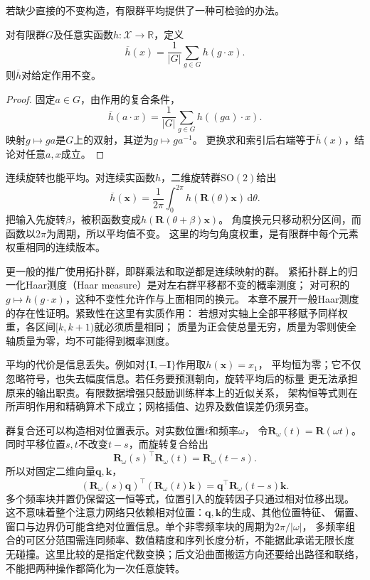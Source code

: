 若缺少直接的不变构造，有限群平均提供了一种可检验的办法。
\begin{theorem}[有限群平均的不变性]
\label{thm:geometry-finite-group-average}
对有限群$G$及任意实函数$h:\mathcal X\to\mathbb R$，定义
\begin{equation}
 \overline h(x)=\frac1{|G|}\sum_{g\in G}h(g\cdot x).
 \label{eq:geometry-finite-group-averaging}
\end{equation}
则$\overline h$对给定作用不变。
\end{theorem}
\begin{proof}
固定$a\in G$，由作用的复合条件，
\[
 \overline h(a\cdot x)=\frac1{|G|}\sum_{g\in G}h((ga)\cdot x).
\]
映射$g\mapsto ga$是$G$上的双射，其逆为$g\mapsto ga^{-1}$。
更换求和索引后右端等于$\overline h(x)$，结论对任意$a,x$成立。
\end{proof}
连续旋转也能平均。对连续实函数$h$，二维旋转群$\mathrm{SO}(2)$给出
\[
 \overline h(\bm x)=\frac1{2\pi}\int_0^{2\pi}
 h(\bm R(\theta)\bm x)\,\mathrm d\theta.
\]
把输入先旋转$\beta$，被积函数变成$h(\bm R(\theta+\beta)\bm x)$。
角度换元只移动积分区间，而函数以$2\pi$为周期，所以平均值不变。
这里的均匀角度权重，是有限群中每个元素权重相同的连续版本。

更一般的推广使用拓扑群，即群乘法和取逆都是连续映射的群。
紧拓扑群上的归一化Haar测度（Haar measure）是对左右群平移都不变的概率测度；
对可积的$g\mapsto h(g\cdot x)$，这种不变性允许作与上面相同的换元。
本章不展开一般Haar测度的存在性证明。紧致性在这里有实质作用：
若想对实轴上全部平移赋予同样权重，各区间$[k,k+1)$就必须质量相同；
质量为正会使总量无穷，质量为零则使全轴质量为零，均不可能得到概率测度。

平均的代价是信息丢失。例如对$\{\bm I,-\bm I\}$作用取$h(\bm x)=x_1$，
平均恒为零；它不仅忽略符号，也失去幅度信息。若任务要预测朝向，旋转平均后的标量
更无法承担原来的输出职责。有限数据增强只鼓励训练样本上的近似关系，
架构恒等式则在所声明作用和精确算术下成立；网格插值、边界及数值误差仍须另查。

群复合还可以构造相对位置表示。对实数位置$t$和频率$\omega$，
令$\bm R_\omega(t)=\bm R(\omega t)$。同时平移位置$s,t$不改变$t-s$，而旋转复合给出
\begin{equation}
 \bm R_\omega(s)^\top\bm R_\omega(t)=\bm R_\omega(t-s).
 \label{eq:geometry-rotary-relative-position}
\end{equation}
所以对固定二维向量$\bm q,\bm k$，
\begin{equation}
 (\bm R_\omega(s)\bm q)^\top(\bm R_\omega(t)\bm k)
 =\bm q^\top\bm R_\omega(t-s)\bm k.
 \label{eq:geometry-rotary-dot-product}
\end{equation}
多个频率块并置仍保留这一恒等式，位置引入的旋转因子只通过相对位移出现。
这不意味着整个注意力网络只依赖相对位置：$\bm q,\bm k$的生成、其他位置特征、
偏置、窗口与边界仍可能含绝对位置信息。单个非零频率块的周期为$2\pi/|\omega|$，
多频率组合的可区分范围需连同频率、数值精度和序列长度分析，不能据此承诺无限长度
无碰撞。这里比较的是指定代数变换；后文沿曲面搬运方向还要给出路径和联络，
不能把两种操作都简化为一次任意旋转。

